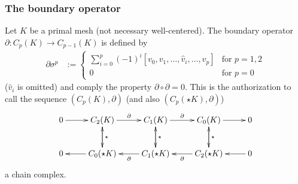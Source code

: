     \subsubsection{The boundary operator}
      Let \( K \) be a primal mesh (not necessary well-centered). 
      The boundary operator \( \partial: C_{p}(K) \rightarrow C_{p-1}(K) \) is defined by
      \begin{align}
        \partial\sigma^{p} &:=
                                \begin{cases}
                                  \sum\limits_{i=0}^{p} (-1)^{i} \left[ v_{0}, v_{1}, \ldots, \hat{v}_{i}, \ldots, v_{p} \right] &
                                  \text{for } p=1,2 \\
                                  0 & \text{for } p=0 
                                \end{cases}
      \end{align}
      (\( \hat{v}_{i} \) is omitted) and comply the property \( \partial\circ\partial = 0\).
      This is the authorization to call the sequence \( \left( C_{p}(K), \partial \right) \) (and also \( \left( C_{p}(\star K), \partial \right) \)) 
      \begin{align}
      \begin{xy}
        \xymatrix{
          0 \ar[r] & 
          C_{2}(K) \ar[r]^{\partial} \ar[d]^{\star} & 
          C_{1}(K) \ar[r]^{\partial} \ar[d]^{\star} & 
          C_{0}(K) \ar[r] \ar[d]^{\star} &
          0 \\
          0  & 
          C_{0}(\star K) \ar[l] \ar[u]& 
          C_{1}( \star K) \ar[l]^{\partial} \ar[u] & 
          C_{2}(\star K) \ar[l]^{\partial} \ar[u] &
          0 \ar[l]
        }
      \end{xy}
      \end{align}
      a chain complex.

